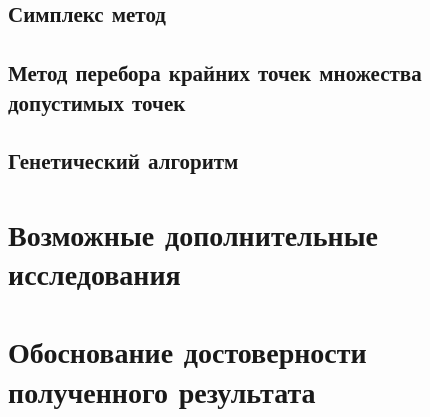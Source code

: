 \documentclass[10pt,a4paper,titlepage]{article}
\begin{document}
\subsection{Симплекс метод} %
\subsection{Метод перебора крайних точек множества допустимых точек}
\subsection{Генетический алгоритм}

\section{Возможные дополнительные исследования}
\section{Обоснование достоверности полученного результата}
\end{document}
